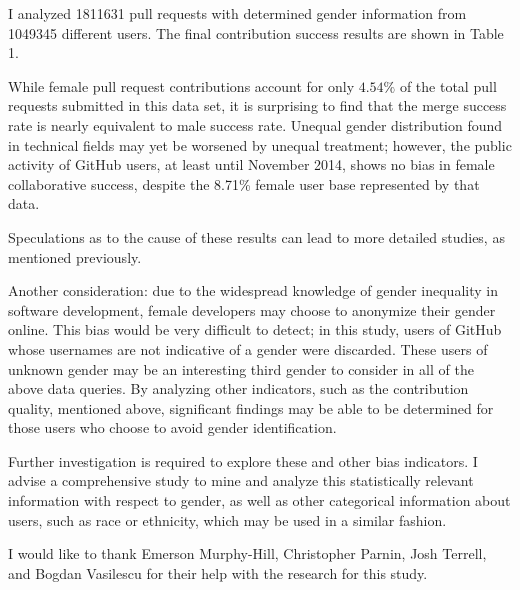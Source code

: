 \documentclass[10pt]{sigplanconf}
\begin{document}
I analyzed \num{1811631} pull requests with determined gender information from
\num{1049345} different users. The final contribution success results are shown in Table 1.

While female pull request contributions account for only $4.54\%$ of the total pull
requests submitted in this data set, it is surprising to find that the merge
success rate is nearly equivalent to male success rate. Unequal gender
distribution found in technical fields may yet be worsened by unequal treatment;
however, the public activity of GitHub users, at least until November 2014,
shows no bias in female collaborative success, despite the 8.71\% female
user base represented by that data.

Speculations as to the cause of these results can lead to more detailed studies,
as mentioned previously.

Another consideration: due to the widespread knowledge of gender inequality in software development,
female developers may choose to anonymize their gender online. This bias would
be very difficult to detect; in this study, users of GitHub whose usernames are
not indicative of a gender were discarded. These users of unknown gender may be
an interesting third gender to consider in all of the above data queries. By
analyzing other indicators, such as the contribution quality, mentioned above,
significant findings may be able to be determined for those users who choose to
avoid gender identification.

Further investigation is required to explore these and other bias indicators. I
advise a comprehensive study to mine and analyze this statistically relevant
information with respect to gender, as well as other categorical information
about users, such as race or ethnicity, which may be used in a similar fashion.


\acks
I would like to thank Emerson Murphy-Hill, Christopher Parnin, Josh Terrell, and
Bogdan Vasilescu for their help with the research for this study.






\end{document}
